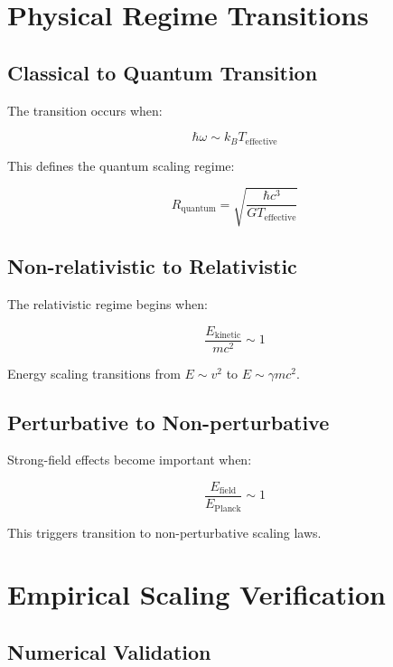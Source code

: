 \documentclass[12pt,a4paper]{article}
\begin{document}
\section{Physical Regime Transitions}

\subsection{Classical to Quantum Transition}

The transition occurs when:

\begin{equation}
\hbar \omega \sim k_B T_{\text{effective}}
\end{equation}

This defines the quantum scaling regime:

\begin{equation}
R_{\text{quantum}} = \sqrt{\frac{\hbar c^3}{GT_{\text{effective}}}}
\end{equation}

\subsection{Non-relativistic to Relativistic}

The relativistic regime begins when:

\begin{equation}
\frac{E_{\text{kinetic}}}{mc^2} \sim 1
\end{equation}

Energy scaling transitions from $E \sim v^2$ to $E \sim \gamma mc^2$.

\subsection{Perturbative to Non-perturbative}

Strong-field effects become important when:

\begin{equation}
\frac{E_{\text{field}}}{E_{\text{Planck}}} \sim 1
\end{equation}

This triggers transition to non-perturbative scaling laws.

\section{Empirical Scaling Verification}

\subsection{Numerical Validation}
\end{document}
